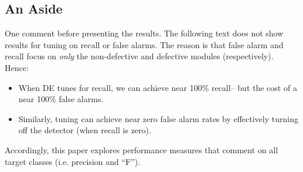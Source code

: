 \documentclass{sig-alternative}
\newcommand{\bi}{\begin{itemize}[leftmargin=0.4cm]}
\newcommand{\ei}{\end{itemize}}
\begin{document}
\subsection{An Aside}

One comment before presenting the results. The following text does not
show results for tuning on recall
or false alarms. The reason is that false alarm and recall focus on {\em only}
the non-defective and defective modules (respectively). Hence:
\bi
\item
When DE tunes for recall, we can achieve near
100\% recall-- but the cost of a near 100\% false alarms.
\item
Similarly,  tuning
can achieve near zero false alarm rates by effectively turning off
the detector (when recall is zero).
\ei
Accordingly,  this paper  explores performance measures that comment on all 
target classes (i.e. precision and ``F''). 
\end{document}
